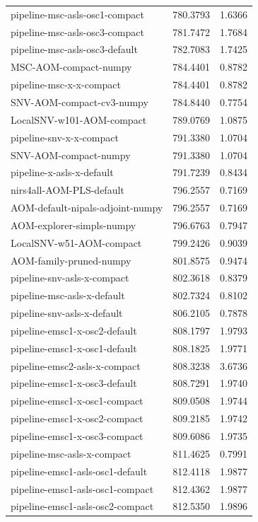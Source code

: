\begin{tabular}{lrr}
pipeline-msc-asls-osc1-compact & 780.3793 & 1.6366 \\
pipeline-msc-asls-osc3-compact & 781.7472 & 1.7684 \\
pipeline-msc-asls-osc3-default & 782.7083 & 1.7425 \\
MSC-AOM-compact-numpy & 784.4401 & 0.8782 \\
pipeline-msc-x-x-compact & 784.4401 & 0.8782 \\
SNV-AOM-compact-cv3-numpy & 784.8440 & 0.7754 \\
LocalSNV-w101-AOM-compact & 789.0769 & 1.0875 \\
pipeline-snv-x-x-compact & 791.3380 & 1.0704 \\
SNV-AOM-compact-numpy & 791.3380 & 1.0704 \\
pipeline-x-asls-x-default & 791.7239 & 0.8434 \\
nirs4all-AOM-PLS-default & 796.2557 & 0.7169 \\
AOM-default-nipals-adjoint-numpy & 796.2557 & 0.7169 \\
AOM-explorer-simpls-numpy & 796.6763 & 0.7947 \\
LocalSNV-w51-AOM-compact & 799.2426 & 0.9039 \\
AOM-family-pruned-numpy & 801.8575 & 0.9474 \\
pipeline-snv-asls-x-compact & 802.3618 & 0.8379 \\
pipeline-msc-asls-x-default & 802.7324 & 0.8102 \\
pipeline-snv-asls-x-default & 806.2105 & 0.7878 \\
pipeline-emsc1-x-osc2-default & 808.1797 & 1.9793 \\
pipeline-emsc1-x-osc1-default & 808.1825 & 1.9771 \\
pipeline-emsc2-asls-x-compact & 808.3238 & 3.6736 \\
pipeline-emsc1-x-osc3-default & 808.7291 & 1.9740 \\
pipeline-emsc1-x-osc1-compact & 809.0508 & 1.9744 \\
pipeline-emsc1-x-osc2-compact & 809.2185 & 1.9742 \\
pipeline-emsc1-x-osc3-compact & 809.6086 & 1.9735 \\
pipeline-msc-asls-x-compact & 811.4625 & 0.7991 \\
pipeline-emsc1-asls-osc1-default & 812.4118 & 1.9877 \\
pipeline-emsc1-asls-osc1-compact & 812.4362 & 1.9877 \\
pipeline-emsc1-asls-osc2-compact & 812.5350 & 1.9896 \\

\end{tabular}
